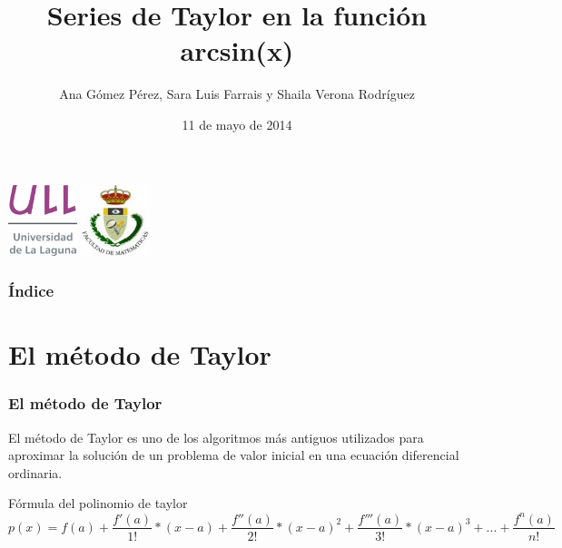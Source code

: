 \documentclass{beamer}
\title[Series de Taylor en \textsc{Beamer}]{Series de Taylor en la función arcsin(x)}
\author[A. Gómez, S. Luis y S. Verona]{Ana Gómez Pérez, Sara Luis Farrais y Shaila Verona Rodríguez}
\date[11/05/14]{11 de mayo de 2014}
\begin{document}
\begin{frame}
\includegraphics[width=0.15\textwidth]{ull.jpeg}
\hspace*{7.5cm}
\includegraphics[width=0.15\textwidth]{indice.jpeg}
\hspace*{7.5cm}
\titlepage
\end{frame}

\begin{frame}
\frametitle{Índice}
\tableofcontents[pausesections]

\end{frame}

\section{El método de Taylor}

\begin{frame}
\frametitle{El método de Taylor}
El método de Taylor es uno de los algoritmos más antiguos utilizados para aproximar la solución de un problema de valor inicial en una ecuación diferencial ordinaria.

\begin{block}{Fórmula del polinomio de taylor}
$$p(x)=f(a)+\frac{f'(a)}{1!}*(x-a)+\frac{f''(a)}{2!}*(x-a)^2+\frac{f'''(a)}{3!}*(x-a)^3+...+\frac{f^n(a)}{n!}$$ 
\end{block}

\end{frame}
\end{document}
